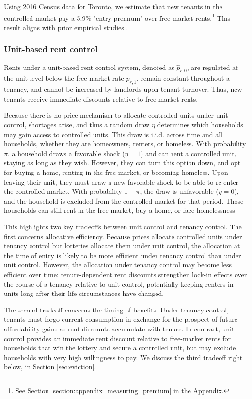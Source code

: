 \documentclass[parskip=full]{article}
\begin{document}
Using 2016 Census data for Toronto, we estimate that new tenants in the controlled market pay a 5.9\% "entry premium" over free-market rents.\footnote{See Section \ref{section:appendix_measuring_premium} in the Appendix.} This result aligns with prior empirical studies \citep{nagy-1997,early-2000,cjq-2023}. 

\subsubsection{Unit-based rent control}

Rents under a unit-based rent control system, denoted as $\hat{p}_{r,0}$, are regulated at the unit level below the free-market rate $p_{r,1}$, remain constant throughout a tenancy, and cannot be increased by landlords upon tenant turnover. Thus, new tenants receive immediate discounts relative to free-market rents. 

Because there is no price mechanism to allocate controlled units under unit control, shortages arise, and thus a random draw $\eta$ determines which households may gain access to controlled units. This draw is i.i.d. across time and all households, whether they are homeowners, renters, or homeless. With probability $\pi$, a household draws a favorable shock ($\eta=1$) and can rent a controlled unit, staying as long as they wish. However, they can turn this option down, and opt for buying a home, renting in the free market, or becoming homeless. Upon leaving their unit, they must draw a new favorable shock to be able to re-enter the controlled market. With probability $1-\pi$, the draw is unfavorable ($\eta=0$), and the household is excluded from the controlled market for that period. Those households can still rent in the free market, buy a home, or face homelessness. 

This highlights two key tradeoffs between unit control and tenancy control. The first concerns allocative efficiency. Because prices allocate controlled units under tenancy control but lotteries allocate them under unit control, the allocation at the time of entry is likely to be more efficient under tenancy control than under unit control. However, the allocation under tenancy control may become less efficient over time: tenure-dependent rent discounts strengthen lock-in effects over the course of a tenancy relative to unit control, potentially keeping renters in units long after their life circumstances have changed.

The second tradeoff concerns the timing of benefits. Under tenancy control, tenants must forgo current consumption in exchange for the prospect of future affordability gains as rent discounts accumulate with tenure. In contrast, unit control provides an immediate rent discount relative to free-market rents for households that win the lottery and secure a controlled unit, but may exclude households with very high willingness to pay. We discuss the third tradeoff right below, in Section \ref{sec:eviction}.
\end{document}
